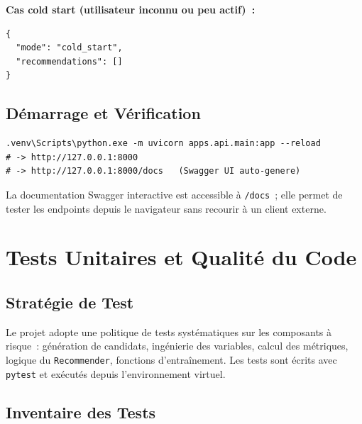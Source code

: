 \documentclass[11pt, a4paper]{article}
\begin{document}
\textbf{Cas cold start (utilisateur inconnu ou peu actif)~:}
\begin{lstlisting}[style=jn]
{
  "mode": "cold_start",
  "recommendations": []
}
\end{lstlisting}

\subsection{Démarrage et Vérification}

\begin{lstlisting}[style=sh]
.venv\Scripts\python.exe -m uvicorn apps.api.main:app --reload
# -> http://127.0.0.1:8000
# -> http://127.0.0.1:8000/docs   (Swagger UI auto-genere)
\end{lstlisting}

La documentation Swagger interactive est accessible à
\texttt{/docs}~; elle permet de tester les endpoints depuis le
navigateur sans recourir à un client externe.

\newpage
\section{Tests Unitaires et Qualité du Code}

\subsection{Stratégie de Test}

Le projet adopte une politique de tests systématiques sur les
composants à risque~: génération de candidats, ingénierie des
variables, calcul des métriques, logique du \texttt{Recommender},
fonctions d'entraînement. Les tests sont écrits avec \texttt{pytest}
et exécutés depuis l'environnement virtuel.

\subsection{Inventaire des Tests}
\end{document}
